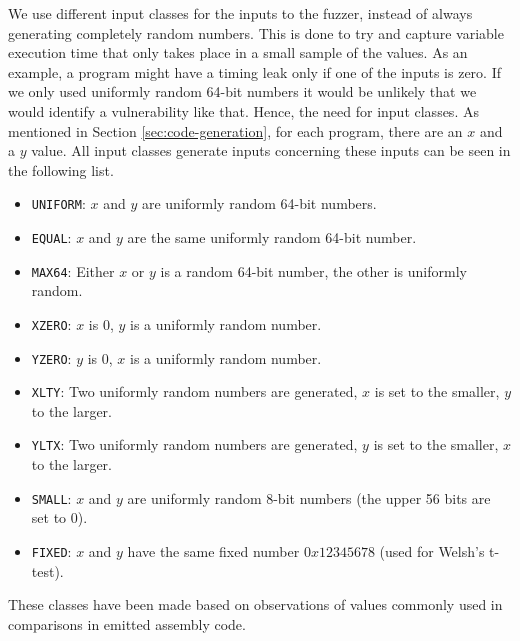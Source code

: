 We use different input classes for the inputs to the fuzzer, instead of always generating completely random numbers. 
This is done to try and capture variable execution time that only takes place in a small sample of the values. 
As an example, a program might have a timing leak only if one of the inputs is zero. 
If we only used uniformly random 64-bit numbers it would be unlikely that we would identify a vulnerability like that. 
Hence, the need for input classes. 
As mentioned in Section \ref{sec:code-generation}, for each program, there are an $x$ and a $y$ value. 
All input classes generate inputs concerning these inputs can be seen in the following list.
\begin{itemize}
    \setlength\itemsep{-0.5em}
    \item \texttt{UNIFORM}: $x$ and $y$ are uniformly random 64-bit numbers.
    \item \texttt{EQUAL}:  $x$ and $y$ are the same uniformly random 64-bit number.
    \item \texttt{MAX64}: Either $x$ or $y$ is a random 64-bit number, the other is uniformly random.
    \item \texttt{XZERO}: $x$ is 0, $y$ is a uniformly random number.
    \item \texttt{YZERO}: $y$ is 0, $x$ is a uniformly random number.
    \item \texttt{XLTY}: Two uniformly random numbers are generated, $x$ is set to the smaller, $y$ to the larger.
    \item \texttt{YLTX}: Two uniformly random numbers are generated, $y$ is set to the smaller, $x$ to the larger.
    \item \texttt{SMALL}: $x$ and $y$ are uniformly random 8-bit numbers (the upper 56 bits are set to 0).
    \item \texttt{FIXED}: $x$ and $y$ have the same fixed number $0x12345678$ (used for Welsh's t-test).
\end{itemize}
These classes have been made based on observations of values commonly used in comparisons in emitted assembly code.

